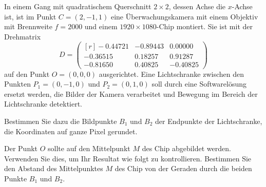 In einem Gang mit quadratischem Querschnitt $2\times 2$, dessen
Achse die $x$-Achse ist, ist im Punkt 
$C=(2,-1,1)$ eine Überwachungskamera mit einem Objektiv mit
Brennweite $f=2000$ und einem $1920\times 1080$-Chip montiert.
Sie ist mit der Drehmatrix
\[
D=
\begin{pmatrix*}[r]
  -0.44721&  -0.89443&  0.00000\\
  -0.36515&   0.18257&  0.91287\\
  -0.81650&   0.40825& -0.40825
\end{pmatrix*}
\]
auf den Punkt $O=(0,0,0)$ ausgerichtet. 
Eine Lichtschranke zwischen den Punkten $P_1=(0,-1,0)$
und $P_2=(0,1,0)$ soll durch eine Softwarelösung
ersetzt werden, die Bilder der Kamera verarbeitet und Bewegung
im Bereich der Lichtschranke detektiert.
\begin{teilaufgaben}
\item
Bestimmen Sie dazu die Bildpunkte $B_1$ und $B_2$ der Endpunkte
der Lichtschranke, die Koordinaten auf ganze Pixel gerundet.
\item
Der Punkt $O$ sollte auf den Mittelpunkt $M$ des Chip abgebildet werden.
Verwenden Sie dies, um Ihr Resultat wie folgt zu kontrollieren.
Bestimmen Sie den Abstand des Mittelpunktes $M$
des Chip von der Geraden durch die beiden Punkte $B_1$ und $B_2$.
\end{teilaufgaben}

